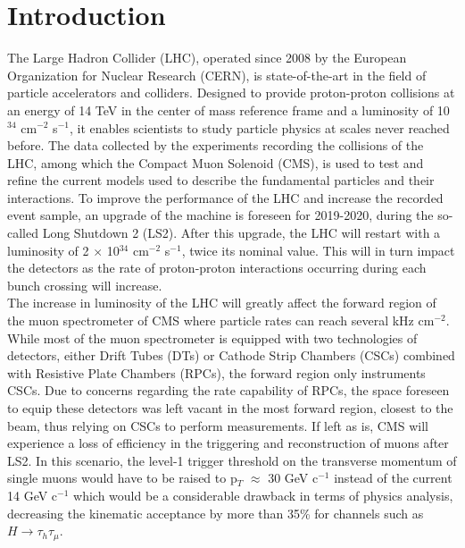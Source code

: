 \chapter*{Introduction}
\label{chap:0-4-introduction}

  \vspace{2cm}

  The Large Hadron Collider (LHC), operated since 2008 by the European Organization for Nuclear Research (CERN), is state-of-the-art in the field of particle accelerators and colliders. Designed to provide proton-proton collisions at an energy of 14 TeV in the center of mass reference frame and a luminosity of 10$^{34}$ cm$^{-2}$ s$^{-1}$, it enables scientists to study particle physics at scales never reached before. The data collected by the experiments recording the collisions of the LHC, among which the Compact Muon Solenoid (CMS), is used to test and refine the current models used to describe the fundamental particles and their interactions. To improve the performance of the LHC and increase the recorded event sample, an upgrade of the machine is foreseen for 2019-2020, during the so-called Long Shutdown 2 (LS2). After this upgrade, the LHC will restart with a luminosity of 2 $\times$ 10$^{34}$ cm$^{-2}$ s$^{-1}$, twice its nominal value. This will in turn impact the detectors as the rate of proton-proton interactions occurring during each bunch crossing will increase. \\

  The increase in luminosity of the LHC will greatly affect the forward region of the muon spectrometer of CMS where particle rates can reach several kHz cm$^{-2}$. While most of the muon spectrometer is equipped with two technologies of detectors, either Drift Tubes (DTs) or Cathode Strip Chambers (CSCs) combined with Resistive Plate Chambers (RPCs), the forward region only instruments CSCs. Due to concerns regarding the rate capability of RPCs, the space foreseen to equip these detectors was left vacant in the most forward region, closest to the beam, thus relying on CSCs to perform measurements. If left as is, CMS will experience a loss of efficiency in the triggering and reconstruction of muons after LS2. In this scenario, the level-1 trigger threshold on the transverse momentum of single muons would have to be raised to p$_T$ $ \approx $ 30 GeV c$^{-1}$ instead of the current 14 GeV c$^{-1}$ which would be a considerable drawback in terms of physics analysis, decreasing the kinematic acceptance by more than 35\% for channels such as $ H \rightarrow \tau_h \tau_\mu $. \\

